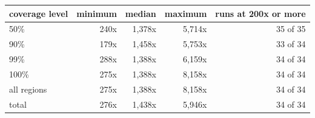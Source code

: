 \begin{tabular}{@{}lrrrr@{}}
\toprule
coverage level & minimum & median & maximum & runs at 200x or more \\
\midrule
50\% & 240x & 1,378x & 5,714x & 35 of 35 \\
90\% & 179x & 1,458x & 5,753x & 33 of 34 \\
99\% & 288x & 1,388x & 6,159x & 34 of 34 \\
100\% & 275x & 1,388x & 8,158x & 34 of 34 \\
all regions & 275x & 1,388x & 8,158x & 34 of 34 \\
total & 276x & 1,438x & 5,946x & 34 of 34 \\
\bottomrule
\end{tabular}